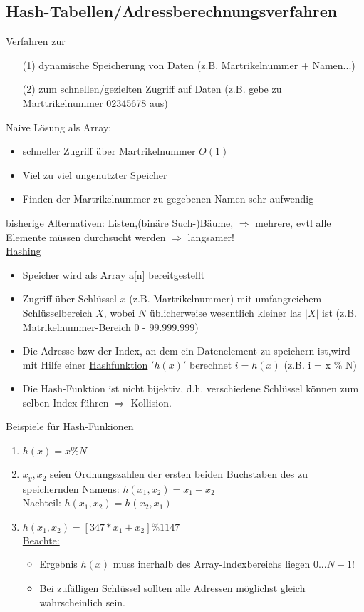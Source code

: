 \subsection{Hash-Tabellen/Adressberechnungsverfahren}
Verfahren zur
\begin{itemize}
    \item[(1)] dynamische Speicherung von Daten (z.B. Martrikelnummer + Namen...)
    \item[(2)] zum schnellen/gezielten Zugriff auf Daten (z.B. \glq gebe zu Marttrikelnummer 02345678 aus\grq)
\end{itemize}
Naive Lösung als Array: \\
\begin{itemize}
    \item schneller Zugriff über Martrikelnummer $O(1)$
    \item Viel zu viel ungenutzter Speicher
    \item Finden der Martrikelnummer zu gegebenen Namen sehr aufwendig
\end{itemize}
bisherige Alternativen: Listen,(binäre Such-)Bäume, $\Rightarrow$ mehrere, evtl alle Elemente müssen durchsucht werden $\Rightarrow$ langsamer! \\
\underline{Hashing}
\begin{itemize}
    \item Speicher wird als Array a[n] bereitgestellt
    \item Zugriff über Schlüssel $x$ (z.B. Martrikelnummer) mit umfangreichem Schlüsselbereich $X$, wobei $N$ üblicherweise wesentlich kleiner las $|X|$ ist (z.B. Matrikelnummer-Bereich 0 - 99.999.999)
    \item Die Adresse bzw der Index, an dem ein Datenelement zu speichern ist,wird mit Hilfe einer \underline{Hashfunktion} $'h(x)'$ berechnet $ i = h(x)$ (z.B. i = x \% N)
    \item Die Hash-Funktion ist nicht bijektiv, d.h. verschiedene Schlüssel können zum selben Index führen $\Rightarrow$ Kollision.
\end{itemize}
Beispiele für Hash-Funkionen
\begin{enumerate}
    \item $h(x) = x \% N$
    \item $x_y,x_2$ seien Ordnungszahlen der ersten beiden Buchstaben des zu speichernden Namens: $h(x_1,x_2) = x_1 + x_2$ \\ Nachteil: $h(x_1,x_2)= h(x_2,x_1)$
    \item $h(x_1,x_2) = [347 * x_1 + x_2] \% 1147$ \\
    \underline{Beachte:}
    \begin{itemize}
        \item Ergebnis $h(x)$ muss inerhalb des Array-Indexbereichs liegen $0...N-1$!
        \item Bei zufälligen Schlüssel sollten alle Adressen möglichst gleich wahrscheinlich sein.
    \end{itemize}
\end{enumerate}
